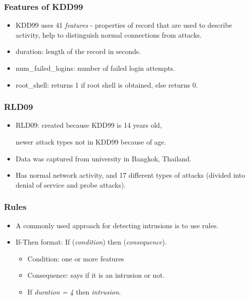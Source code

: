 \documentclass{beamer}
\newcommand{\linespace}{\vskip 0.25cm}
\begin{document}
\begin{frame}
  \frametitle{Features of KDD99}
	\begin{itemize}
		\item KDD99 uses 41 \emph{features} - properties of record that are used to describe activity, help to distinguish normal connections from attacks.
		
		\linespace
		\linespace
		
		\item duration: length of the record in seconds.
		\item num\_failed\_logins: number of failed login attempts.
		\item root\_shell: returns 1 if root shell is obtained, else returns 0.
	\end{itemize}
\end{frame}



\begin{frame}
  \frametitle{RLD09}
	\begin{itemize}
		\item RLD09: created because KDD99 is 14 years old, 
		
		newer attack types not in KDD99 because of age.
		\item Data was captured from university in Bangkok, Thailand.
		\item Has normal network activity, and 17 different types of attacks (divided into denial of service and probe attacks).
	\end{itemize}
\end{frame}



\begin{frame}
  \frametitle{Rules}
	\begin{itemize}
		\item A commonly used approach for detecting intrusions is to use rules.
		\item If-Then format: If (\emph{condition}) then (\emph{consequence}).
		\begin{itemize}
			\item Condition: one or more features
			\item Consequence: says if it is an intrusion or not.
			\linespace
			\item If \emph{duration = 4} then \emph{intrusion}.
		\end{itemize}				
	\end{itemize}
\end{frame}
\end{document}
